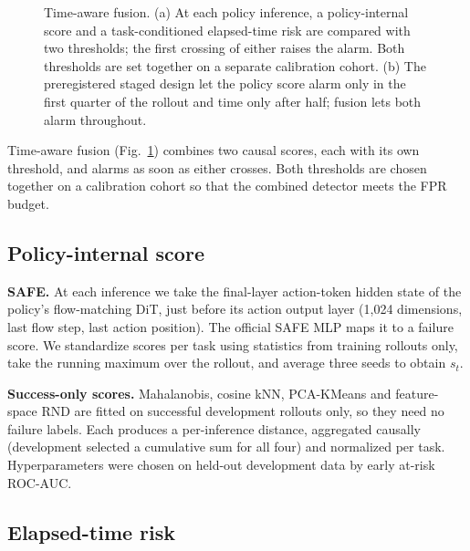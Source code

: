 \documentclass[conference,a4paper]{IEEEtran}
\begin{document}
\begin{figure}[t]
{}
\caption{Time-aware fusion. (a) At each policy inference, a policy-internal score and a
task-conditioned elapsed-time risk are compared with two thresholds; the first crossing of
either raises the alarm. Both thresholds are set together on a separate calibration cohort.
(b) The preregistered staged design let the policy score alarm only in the first quarter of
the rollout and time only after half; fusion lets both alarm throughout.}
\label{fig:method}
\end{figure}

Time-aware fusion (Fig.~\ref{fig:method}) combines two causal scores, each with its own
threshold, and alarms as soon as either crosses. Both thresholds are chosen together on a calibration cohort so that
the combined detector meets the FPR budget.

\subsection{Policy-internal score}

\textbf{SAFE.} At each inference we take the final-layer action-token hidden state of the
policy's flow-matching DiT, just before its action output layer (1,024 dimensions, last
flow step, last action position). The official SAFE MLP maps it to a failure score. We
standardize scores per task using statistics from training rollouts only, take the running
maximum over the rollout, and average three seeds to obtain $s_t$.

\textbf{Success-only scores.} Mahalanobis, cosine kNN, PCA-KMeans and feature-space RND
are fitted on successful development rollouts only, so they need no failure labels. Each
produces a per-inference distance, aggregated causally (development selected a cumulative
sum for all four) and normalized per task. Hyperparameters were chosen on held-out
development data by early at-risk ROC-AUC.

\subsection{Elapsed-time risk}
\end{document}
